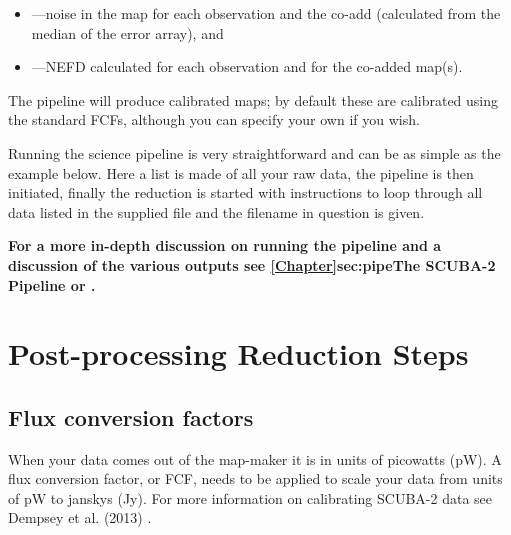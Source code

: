 \documentclass[11pt,oneside,chapters]{starlink}
\begin{document}
\begin{itemize}
\item {}---noise in the map for each observation and the co-add
(calculated from the median of the error array), and
\item {}---NEFD calculated for each observation and for
the co-added map(s).
\end{itemize}
The pipeline will produce calibrated maps; by default these are
calibrated using the standard FCFs, although you can specify your
own if you wish.

Running the science pipeline is very straightforward and can be as
simple as the example below. Here a list is made of all your raw data,
the pipeline is then initiated, finally the reduction is started with
instructions to loop through all data listed in the supplied file and
the filename in question is given.

\begin{terminalv}
\end{terminalv}

\textbf{For a more in-depth discussion on running the pipeline and a discussion
of the various outputs see \cref{Chapter}{sec:pipe}{The SCUBA-2
Pipeline} or \pipelinesun.}



\chapter{Post-processing Reduction Steps}
\label{sec:postprocess}

\section{Flux conversion factors}
\label{sec:cmult}

When your data comes out of the map-maker it is in units of picowatts
(pW). A flux conversion factor, or FCF, needs to be applied to scale
your data from units of pW to janskys (Jy). For more information on
calibrating SCUBA-2 data see Dempsey et al. (2013) \cite{dempsey12}.
\end{document}

